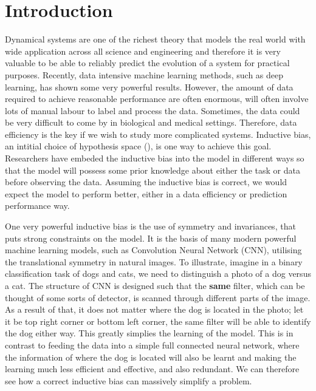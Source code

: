 \documentclass{statsmsc}
\begin{document}
\chapter{Introduction}
Dynamical systems are one of the richest theory that models the real world with wide application across all science and engineering and therefore it is very valuable to be able to reliably predict the evolution of a system for practical purposes.
Recently, data intensive machine learning methods, such as deep learning, has shown some very powerful results. 
However, the amount of data required to achieve reasonable performance are often enormous, will often involve lots of manual labour to label and process the data.
Sometimes, the data could be very difficult to come by in biological and medical settings.
Therefore, data efficiency is the key if we wish to study more complicated systems.
Inductive bias, an intitial choice of hypothesis space (\cite{Baxter2000}), is one way to achieve this goal.
Researchers have embeded the inductive bias into the model in different ways so that the model will possess some prior knowledge about either the task or data before observing the data.
Assuming the inductive bias is correct, we would expect the model to perform better, either in a data efficiency or prediction performance way.

One very powerful inductive bias is the use of symmetry and invariances, that puts strong constraints on the model. 
It is the basis of many modern powerful machine learning models, such as Convolution Neural Network (CNN), utilising the translational symmetry in natural images.
To illustrate, imagine in a binary classification task of dogs and cats, we need to distinguish a photo of a dog versus a cat. 
The structure of CNN is designed such that the \textbf{same} filter, which can be thought of some sorts of detector, is scanned through different parts of the image.  
As a result of that, it does not matter where the dog is located in the photo; let it be top right corner or bottom left corner, the same filter will be able to identify the dog either way.
This greatly simplies the learning of the model.
This is in contrast to feeding the data into a simple full connected neural network, where the information of where the dog is located will also be learnt and making the learning much less efficient and effective, and also redundant.
We can therefore see how a correct inductive bias can massively simplify a problem.
\end{document}
